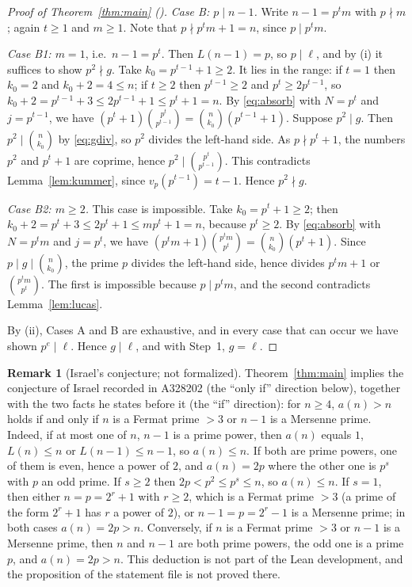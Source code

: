 \documentclass[11pt]{amsart}
\theoremstyle{plain}
\theoremstyle{definition}
\newtheorem{remark}[theorem]{Remark}
\begin{document}
\begin{proof}[Proof of Theorem~\ref{thm:main} ()]
\emph{Case B: $p\mid n-1$.} Write $n-1=p^tm$ with $p\nmid m$; again $t\ge1$ and $m\ge1$. Note that $p\nmid p^tm+1=n$, since $p\mid p^tm$.

\emph{Case B1: $m=1$}, i.e.\ $n-1=p^t$. Then $L(n-1)=p$, so $p\mid\ell$, and by (i) it suffices to show $p^2\nmid g$. Take $k_0=p^{t-1}+1\ge2$. It lies in the range: if $t=1$ then $k_0=2$ and $k_0+2=4\le n$; if $t\ge2$ then $p^{t-1}\ge2$ and $p^t\ge2p^{t-1}$, so $k_0+2=p^{t-1}+3\le 2p^{t-1}+1\le p^t+1=n$. By \eqref{eq:absorb} with $N=p^t$ and $j=p^{t-1}$, we have $(p^t+1)\binom{p^t}{p^{t-1}}=\binom{n}{k_0}(p^{t-1}+1)$.
Suppose $p^2\mid g$. Then $p^2\mid\binom n{k_0}$ by \eqref{eq:gdiv}, so $p^2$ divides the left-hand side. As $p\nmid p^t+1$, the numbers $p^2$ and $p^t+1$ are coprime, hence $p^2\mid\binom{p^t}{p^{t-1}}$. This contradicts Lemma~\ref{lem:kummer}, since $v_p(p^{t-1})=t-1$. Hence $p^2\nmid g$.

\emph{Case B2: $m\ge2$.} This case is impossible. Take $k_0=p^t+1\ge2$; then $k_0+2=p^t+3\le 2p^t+1\le mp^t+1=n$, because $p^t\ge2$. By \eqref{eq:absorb} with $N=p^tm$ and $j=p^t$, we have $(p^tm+1)\binom{p^tm}{p^t}=\binom n{k_0}(p^t+1)$.
Since $p\mid g\mid\binom n{k_0}$, the prime $p$ divides the left-hand side, hence divides $p^tm+1$ or $\binom{p^tm}{p^t}$. The first is impossible because $p\mid p^tm$, and the second contradicts Lemma~\ref{lem:lucas}.

By (ii), Cases A and B are exhaustive, and in every case that can occur we have shown $p^e\mid\ell$. Hence $g\mid\ell$, and with Step~1, $g=\ell$.
\end{proof}

\begin{remark}[Israel's conjecture; not formalized]\label{rem:israel}
Theorem~\ref{thm:main} implies the conjecture of Israel recorded in A328202 (the ``only if'' direction below), together with the two facts he states before it (the ``if'' direction): for $n\ge4$, $a(n)>n$ holds if and only if $n$ is a Fermat prime $>3$ or $n-1$ is a Mersenne prime. Indeed, if at most one of $n$, $n-1$ is a prime power, then $a(n)$ equals $1$, $L(n)\le n$ or $L(n-1)\le n-1$, so $a(n)\le n$. If both are prime powers, one of them is even, hence a power of $2$, and $a(n)=2p$ where the other one is $p^s$ with $p$ an odd prime. If $s\ge2$ then $2p<p^2\le p^s\le n$, so $a(n)\le n$. If $s=1$, then either $n=p=2^r+1$ with $r\ge2$, which is a Fermat prime $>3$ (a prime of the form $2^r+1$ has $r$ a power of $2$), or $n-1=p=2^r-1$ is a Mersenne prime; in both cases $a(n)=2p>n$. Conversely, if $n$ is a Fermat prime $>3$ or $n-1$ is a Mersenne prime, then $n$ and $n-1$ are both prime powers, the odd one is a prime $p$, and $a(n)=2p>n$. This deduction is not part of the Lean development, and the proposition  of the statement file is not proved there.
\end{remark}
\end{document}
